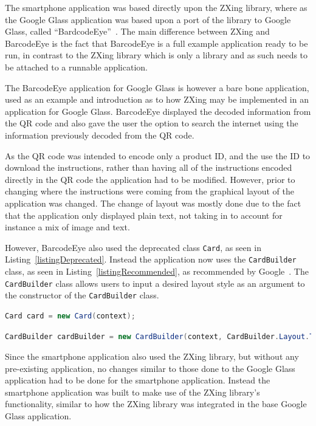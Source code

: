 The smartphone application was based directly upon the ZXing library, where as the Google Glass application was based upon a port of the library to Google Glass, called ``BardcodeEye''~\cite{barcodeEye}. The main difference between ZXing and BarcodeEye is the fact that BarcodeEye is a full example application ready to be run, in contrast to the ZXing library which is only a library and as such needs to be attached to a runnable application.

The BarcodeEye application for Google Glass is however a bare bone application, used as an example and introduction as to how ZXing may be implemented in an application for Google Glass. BarcodeEye displayed the decoded information from the QR code and also gave the user the option to search the internet using the information previously decoded from the QR code.

As the QR code was intended to encode only a product ID, and the use the ID to download the instructions, rather than having all of the instructions encoded directly in the QR code the application had to be modified. However, prior to changing where the instructions were coming from the graphical layout of the application was changed. The change of layout was mostly done due to the fact that the application only displayed plain text, not taking in to account for instance a mix of image and text.

However, BarcodeEye also used the deprecated class \texttt{Card}, as seen in Listing~\ref{listingDeprecated}. Instead the application now uses the \texttt{CardBuilder} class, as seen in Listing~\ref{listingRecommended}, as recommended by Google~\cite{googleCard}. The \texttt{CardBuilder} class allows users to input a desired layout style as an argument to the constructor of the \texttt{CardBuilder} class.

\begin{lstlisting}[language=Java, caption={Instancing of the deprecated class Card}, label=listingDeprecated]
Card card = new Card(context);
\end{lstlisting}

\begin{lstlisting}[language=Java, caption={Instancing of the recommended class CardBuilder}, label=listingRecommended]
CardBuilder cardBuilder = new CardBuilder(context, CardBuilder.Layout.TITLE);
\end{lstlisting}

Since the smartphone application also used the ZXing library, but without any pre-existing application, no changes similar to those done to the Google Glass application had to be done for the smartphone application. Instead the smartphone application was built to make use of the ZXing library's functionality, similar to how the ZXing library was integrated in the base Google Glass application.

